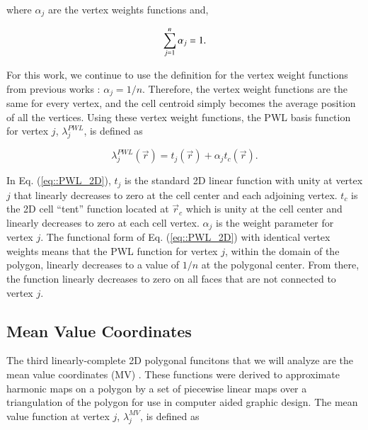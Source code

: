 \documentclass[preprint,10pt]{elsarticle}
\begin{document}
\noindent where $\alpha_{j}$ are the vertex weights functions and, 

\begin{equation}
\label{eq::PWL_2D_vertex_weight_sum}
 \sum\displaylimits_{j=1}^{n} \alpha_{j} = 1.
\end{equation}

\noindent For this work, we continue to use the definition for the vertex weight functions from previous works \cite{ref::PWLD_stone_adams,ref::PWLD_stone_adams_unstructured,bailey2008phd}: $\alpha_{j}= 1/n$. Therefore, the vertex weight functions are the same for every vertex, and the cell centroid simply becomes the average position of all the vertices. Using these vertex weight functions, the PWL basis function for vertex $j$, $\lambda_j^{PWL}$, is defined as

\begin{equation}
\label{eq::PWL_2D}
\lambda_j^{PWL} (\vec{r}) = t_j (\vec{r}) + \alpha_j t_c (\vec{r}) .
\end{equation}

\noindent In Eq. (\ref{eq::PWL_2D}), $t_j$ is the standard 2D linear function with unity at vertex $j$ that linearly decreases to zero at the cell center and each adjoining vertex. $t_c$ is the 2D cell ``tent'' function located at $\vec{r}_{c}$ which is unity at the cell center and linearly decreases to zero at each cell vertex. $\alpha_{j}$ is the weight parameter for vertex $j$. The functional form of Eq. (\ref{eq::PWL_2D}) with identical vertex weights means that the PWL function for vertex $j$, within the domain of the polygon, linearly decreases to a value of $1/n$ at the polygonal center. From there, the function linearly decreases to zero on all faces that are not connected to vertex $j$.

\subsection{Mean Value Coordinates}

The third linearly-complete 2D polygonal funcitons that we will analyze are the mean value coordinates (MV) \cite{floater2003mean,floater2015generalized}. These functions were derived to approximate harmonic maps on a polygon by a set of piecewise linear maps over a triangulation of the polygon for use in computer aided graphic design. The mean value function at vertex $j$, $\lambda_{j}^{MV}$, is defined as
\end{document}
